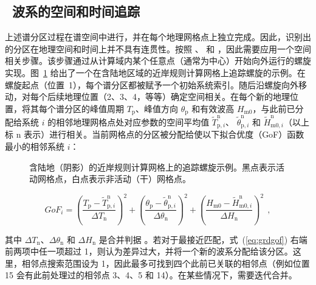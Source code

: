 \vssub
\subsection{~波系的空间和时间追踪} \label{sub:num_track}

\noindent
上述谱分区过程在谱空间中进行，并在每个地理网格点上独立完成。因此，识别出的分区在地理空间和时间上并不具有连贯性。按照 \cite{art:VMH97}、\cite{art:HP01} 和 \cite{pro:DHL09}，因此需要应用一个空间相关步骤。该步骤通过从计算域内某个任意点（通常为中心）开始向外运行的螺旋实现。图~\ref{fig:wavetrack} 给出了一个在含陆地区域的近岸规则计算网格上追踪螺旋的示例。在螺旋起点（位置~1），每个谱分区都被赋予一个初始系统索引。随后沿螺旋向外移动，对每个后续地理位置（2、3、4，等等）确定空间相关。在每个新的地理位置，将其每个谱分区的峰值周期 $T_\mathrm{p}$、峰值方向 $\theta_\mathrm{p}$ 和有效波高 $H_\mathrm{m0}$，与此前已分配给系统 $i$ 的相邻地理网格点处对应参数的空间平均值
$\tilde{T}^\mathrm{n}_{\mathrm{p},i}$、
$\tilde{\theta}^\mathrm{n}_{\mathrm{p},i}$ 和
$\tilde{H}^\mathrm{n}_{\mathrm{m0},i}$（以上标
$\mathrm{n}$ 表示）进行相关。当前网格点的分区被分配给使以下拟合优度（GoF）函数最小的相邻系统 $i$：

\begin{figure} \begin{center}
\caption{含陆地（阴影）的近岸规则计算网格上的追踪螺旋示例。黑点表示活动网格点，白点表示非活动（干）网格点。}
         \label{fig:wavetrack} \botline
\end{center}
\end{figure}

\begin{equation}
    GoF_{i} = {\left( \frac{T_\mathrm{p} - \tilde{T}^\mathrm{n}_{\mathrm{p},i}}{\Delta T_\mathrm{n}} \right)}^2 + 
                     {\left( \frac{\theta_\mathrm{p} - \tilde{\theta}^\mathrm{n}_{\mathrm{p},i}}{\Delta\theta_\mathrm{n}} \right)}^2 +
                     {\left( \frac{H_\mathrm{m0} - \tilde{H}^\mathrm{n}_{\mathrm{m0},i}}{\Delta H_\mathrm{n}} \right)}^2\ \ ,
\label{eq:grdgof}
\end{equation} 

\noindent
其中 $\Delta T_\mathrm{n}$、$\Delta\theta_\mathrm{n}$ 和 $\Delta
H_\mathrm{n}$ 是合并判据 \citep{art:WHD13}。若对于最接近匹配，式~(\ref{eq:grdgof}) 右端前两项中任一项超过 1，则认为差异过大，并将一个新的波系分配给该分区。这里，相邻点搜索范围设为 1，因此最多可找到四个此前已关联的相邻点（例如位置 15 会有此前处理过的相邻点 3、4、5 和 14）。在某些情况下，需要迭代合并。

